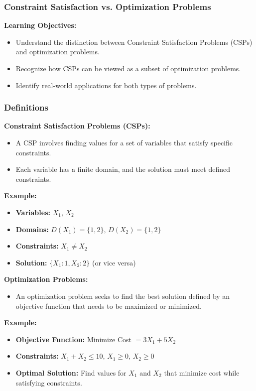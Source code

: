 \documentclass[aspectratio=169]{beamer}
\begin{document}
\begin{frame}[fragile]
    \frametitle{Constraint Satisfaction vs. Optimization Problems}
    
    \textbf{Learning Objectives:}
    \begin{itemize}
        \item Understand the distinction between Constraint Satisfaction Problems (CSPs) and optimization problems.
        \item Recognize how CSPs can be viewed as a subset of optimization problems.
        \item Identify real-world applications for both types of problems.
    \end{itemize}
\end{frame}

\begin{frame}[fragile]
    \frametitle{Definitions}
    
    \textbf{Constraint Satisfaction Problems (CSPs):}
    \begin{itemize}
        \item A CSP involves finding values for a set of variables that satisfy specific constraints.
        \item Each variable has a finite domain, and the solution must meet defined constraints.
    \end{itemize}
    
    \textbf{Example:}
    \begin{itemize}
        \item \textbf{Variables:} $X_1$, $X_2$
        \item \textbf{Domains:} $D(X_1) = \{1, 2\}$, $D(X_2) = \{1, 2\}$
        \item \textbf{Constraints:} $X_1 \neq X_2$
        \item \textbf{Solution:} $\{X_1: 1, X_2: 2\}$ (or vice versa)
    \end{itemize}
    
    \textbf{Optimization Problems:}
    \begin{itemize}
        \item An optimization problem seeks to find the best solution defined by an objective function that needs to be maximized or minimized.
    \end{itemize}
    
    \textbf{Example:}
    \begin{itemize}
        \item \textbf{Objective Function:} Minimize Cost $= 3X_1 + 5X_2$
        \item \textbf{Constraints:} $X_1 + X_2 \leq 10$, $X_1 \geq 0$, $X_2 \geq 0$
        \item \textbf{Optimal Solution:} Find values for $X_1$ and $X_2$ that minimize cost while satisfying constraints.
    \end{itemize}
\end{frame}
\end{document}
